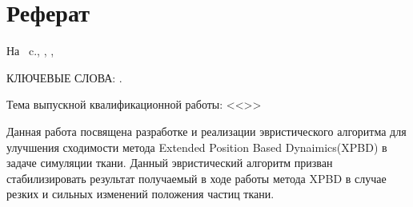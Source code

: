 \chapter*[Count-me]{Реферат} %
\thispagestyle{empty}%
%
%



На ~c.,  
,
,

{\MakeUppercase{Ключевые слова: \keywordsRu}.}%

Тема выпускной квалификационной работы: <<\thesisTitle>>%



Данная работа посвящена разработке и реализации эвристического алгоритма для улучшения сходимости метода Extended Position Based Dynaimics(XPBD) в задаче симуляции ткани. Данный эвристический алгоритм призван стабилизировать результат получаемый в ходе работы метода XPBD в случае резких и сильных изменений положения частиц ткани.

